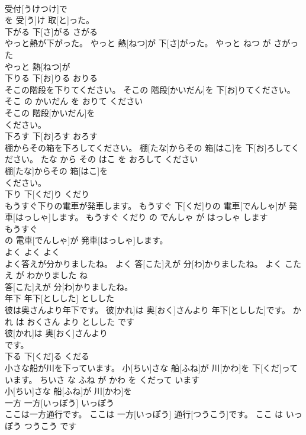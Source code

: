 \documentclass[8pt]{extreport}
\begin{document}
\begin{CJK}{UTF8}{min}
\\	受付[うけつけ]で
\\	を 受[う]け 取[と]った。			
\\	下がる	下[さ]がる	さがる	
\\	やっと熱が下がった。	やっと 熱[ねつ]が 下[さ]がった。	やっと ねつ が さがった	
\\	やっと 熱[ねつ]が
\\	下りる	下[お]りる	おりる	
\\	そこの階段を下りてください。	そこの 階段[かいだん]を 下[お]りてください。	そこ の かいだん を おりて ください	
\\	そこの 階段[かいだん]を
\\	ください。			
\\	下ろす	下[お]ろす	おろす	
\\	棚からその箱を下ろしてください。	棚[たな]からその 箱[はこ]を 下[お]ろしてください。	たな から その はこ を おろして ください	
\\	棚[たな]からその 箱[はこ]を
\\	ください。			
\\	下り	下[くだ]り	くだり	
\\	もうすぐ下りの電車が発車します。	もうすぐ 下[くだ]りの 電車[でんしゃ]が 発車[はっしゃ]します。	もうすぐ くだり の でんしゃ が はっしゃ します	
\\	もうすぐ
\\	の 電車[でんしゃ]が 発車[はっしゃ]します。			
\\	よく	よく	よく	
\\	よく答えが分かりましたね。	よく 答[こた]えが 分[わ]かりましたね。	よく こたえ が わかりました ね	
\\	答[こた]えが 分[わ]かりましたね。			
\\	年下	年下[としした]	としした	
\\	彼は奥さんより年下です。	彼[かれ]は 奥[おく]さんより 年下[としした]です。	かれ は おくさん より としした です	
\\	彼[かれ]は 奥[おく]さんより
\\	です。			
\\	下る	下[くだ]る	くだる	
\\	小さな船が川を下っています。	小[ちい]さな 船[ふね]が 川[かわ]を 下[くだ]っています。	ちいさ な ふね が かわ を くだって います	
\\	小[ちい]さな 船[ふね]が 川[かわ]を
\\	一方	一方[いっぽう]	いっぽう	
\\	ここは一方通行です。	ここは 一方[いっぽう] 通行[つうこう]です。	ここ は いっぽう つうこう です	

\end{CJK}
\end{document}
